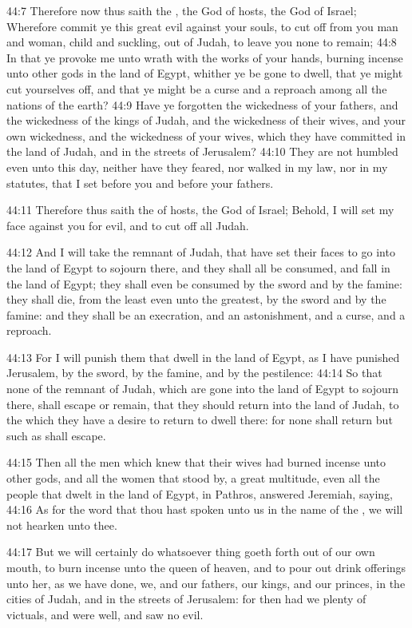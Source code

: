 44:7 Therefore now thus saith the \LORD, the God of hosts, the God of
Israel; Wherefore commit ye this great evil against your souls, to cut
off from you man and woman, child and suckling, out of Judah, to leave
you none to remain; 44:8 In that ye provoke me unto wrath with the
works of your hands, burning incense unto other gods in the land of
Egypt, whither ye be gone to dwell, that ye might cut yourselves off,
and that ye might be a curse and a reproach among all the nations of
the earth?  44:9 Have ye forgotten the wickedness of your fathers, and
the wickedness of the kings of Judah, and the wickedness of their
wives, and your own wickedness, and the wickedness of your wives,
which they have committed in the land of Judah, and in the streets of
Jerusalem?  44:10 They are not humbled even unto this day, neither
have they feared, nor walked in my law, nor in my statutes, that I set
before you and before your fathers.

44:11 Therefore thus saith the \LORD of hosts, the God of Israel;
Behold, I will set my face against you for evil, and to cut off all
Judah.

44:12 And I will take the remnant of Judah, that have set their faces
to go into the land of Egypt to sojourn there, and they shall all be
consumed, and fall in the land of Egypt; they shall even be consumed
by the sword and by the famine: they shall die, from the least even
unto the greatest, by the sword and by the famine: and they shall be
an execration, and an astonishment, and a curse, and a reproach.

44:13 For I will punish them that dwell in the land of Egypt, as I
have punished Jerusalem, by the sword, by the famine, and by the
pestilence: 44:14 So that none of the remnant of Judah, which are gone
into the land of Egypt to sojourn there, shall escape or remain, that
they should return into the land of Judah, to the which they have a
desire to return to dwell there: for none shall return but such as
shall escape.

44:15 Then all the men which knew that their wives had burned incense
unto other gods, and all the women that stood by, a great multitude,
even all the people that dwelt in the land of Egypt, in Pathros,
answered Jeremiah, saying, 44:16 As for the word that thou hast spoken
unto us in the name of the \LORD, we will not hearken unto thee.

44:17 But we will certainly do whatsoever thing goeth forth out of our
own mouth, to burn incense unto the queen of heaven, and to pour out
drink offerings unto her, as we have done, we, and our fathers, our
kings, and our princes, in the cities of Judah, and in the streets of
Jerusalem: for then had we plenty of victuals, and were well, and saw
no evil.

